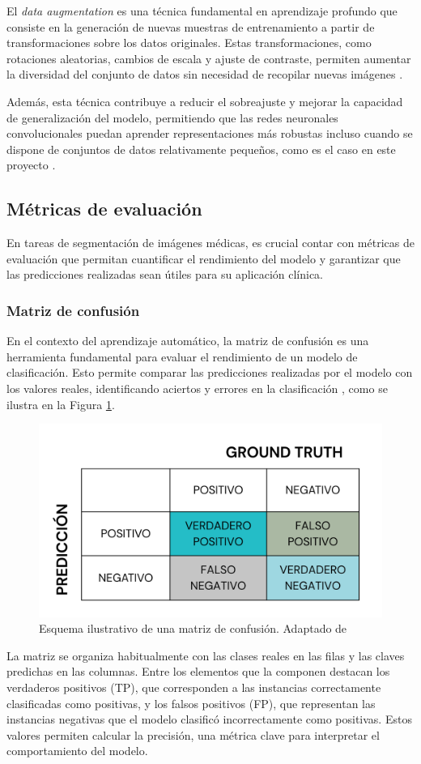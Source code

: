 El \textit{data augmentation} es una técnica fundamental en aprendizaje profundo que consiste en la generación de nuevas muestras de entrenamiento a partir de transformaciones sobre los datos originales. Estas transformaciones, como rotaciones aleatorias, cambios de escala y ajuste de contraste, permiten aumentar la diversidad del conjunto de datos sin necesidad de recopilar nuevas imágenes \cite{shorten2019da}.

Además, esta técnica contribuye a reducir el sobreajuste y mejorar la capacidad de generalización del modelo, permitiendo que las redes neuronales convolucionales puedan aprender representaciones más robustas incluso cuando se dispone de conjuntos de datos relativamente pequeños, como es el caso en este proyecto \cite{perez2017da}.

\subsection{Métricas de evaluación}
En tareas de segmentación de imágenes médicas, es crucial contar con métricas de evaluación que permitan cuantificar el rendimiento del modelo y garantizar que las predicciones realizadas sean útiles para su aplicación clínica.

\subsubsection{Matriz de confusión}
En el contexto del aprendizaje automático, la matriz de confusión es una herramienta fundamental para evaluar el rendimiento de un modelo de clasificación. Esto permite comparar las predicciones realizadas por el modelo con los valores reales, identificando aciertos y errores en la clasificación \cite{matrizconfusion}, como se ilustra en la Figura \ref{fig:matriz_confusion}.

\begin{figure}[h]
    \centering
    \includegraphics[width= 0.8 \textwidth]{img/matriz_confusion.png}
    \caption{Esquema ilustrativo de una matriz de confusión. Adaptado de \cite{matrizconfusionimage}}
    \label{fig:matriz_confusion}
\end{figure}
La matriz se organiza habitualmente con las clases reales en las filas y las claves predichas en las columnas. Entre los elementos que la componen destacan los verdaderos positivos (TP), que corresponden a las instancias correctamente clasificadas como positivas, y los falsos positivos (FP), que representan las instancias negativas que el modelo clasificó incorrectamente como positivas. Estos valores permiten calcular la precisión, una métrica clave para interpretar el comportamiento del modelo.


